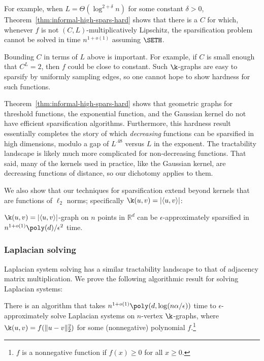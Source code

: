 For example, when $L = \Theta(\log^{2+\delta} n)$ for some constant
$\delta > 0$, Theorem~\ref{thm:informal-high-spars-hard} shows that
there is a $C$ for which, whenever $f$ is not $(C,L)$-multiplicatively
Lipschitz, the sparsification problem cannot be solved in time
$n^{1+o(1)}$ assuming $\SETH$.

Bounding $C$ in terms of $L$ above is important. For example, if $C$ is
small enough that $C^L = 2$, then $f$ could be close to constant. Such
$\k$-graphs are easy to sparsify by uniformly sampling edges, so one
cannot hope to show hardness for such functions.

Theorem~\ref{thm:informal-high-spars-hard} shows that geometric graphs
for threshold functions, the exponential function, and the Gaussian
kernel do not have efficient sparsification algorithms. Furthermore,
       this hardness result essentially completes the story of which
       \emph{decreasing} functions can be sparsified in high dimensions,
       modulo a gap of $L^{.48}$ versus $L$ in the exponent. The
       tractability landscape is likely much more complicated for
       non-decreasing functions. That said, many of the kernels used in
       practice, like the Gaussian kernel, are decreasing functions of
       distance, so our dichotomy applies to them.

We also show that our techniques for sparsification extend beyond
kernels that are functions of $\ell_2$ norms; specifically $\k(u,v) =
|\langle u,v\rangle|$:

\begin{lemma}\label{thm:sparsabsinnerproduct}
$\k(u,v) = |\langle u,v\rangle|$-graph on $n$ points in $\mathbb{R}^d$
can be $\epsilon$-approximately sparsified in $n^{1+o(1)} \poly(d)
  /\epsilon^2$ time.  \end{lemma}

\subsubsection{Laplacian solving}

Laplacian system solving has a similar tractability landscape to that of
adjacency matrix multiplication. We prove the following algorithmic
result for solving Laplacian systems:

\begin{theorem}\label{thm:informal-lapl-poly}
There is an algorithm that takes $ n^{1+o(1)}
\poly(d,\log(n\alpha/\epsilon))$ time to $\epsilon$-approximately solve
Laplacian systems on $n$-vertex $\k$-graphs, where $\k(u,v) =
f(\|u-v\|_2^2)$ for some (nonnegative) polynomial $f$.\footnote{$f$ is a
  nonnegative function if $f(x) \geq 0$ for all $x \geq 0$.}
  \end{theorem}

